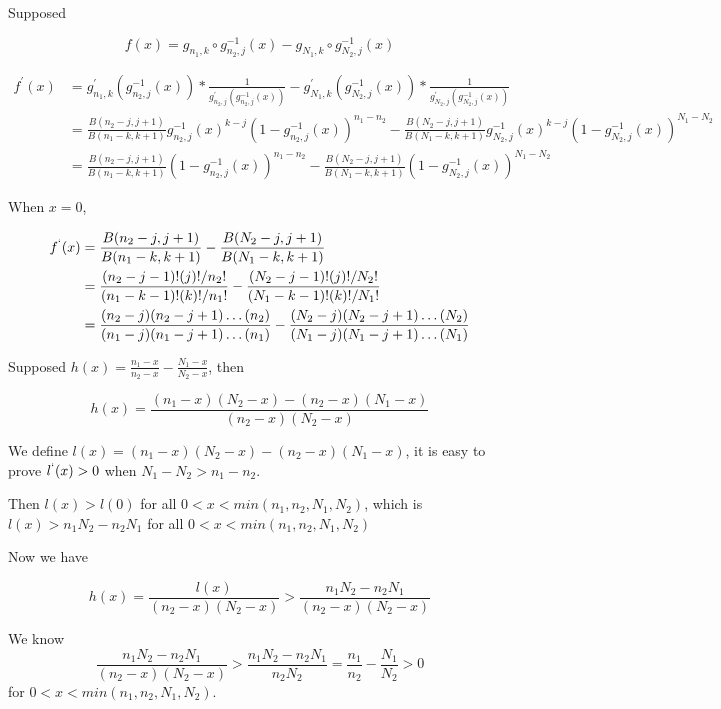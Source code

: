 \documentclass[12pt]{article}
\begin{document}
Supposed

$$f(x) = g_{n_1, k} \circ g_{n_2, j}^{-1}(x) - g_{N_1, k} \circ g_{N_2, j}^{-1}(x)$$

\begin{align*}
	f^{'}(x) &= g_{n_1, k}^{'} ( g_{n_2, j}^{-1}(x)) *\frac{1}{g_{n_2, j}^{'} ( g_{n_2, j}^{-1}(x))} - g_{N_1, k}^{'} ( g_{N_2, j}^{-1}(x)) *\frac{1}{g_{N_2, j}^{'} ( g_{N_2, j}^{-1}(x))} \\
	&= \frac{B(n_2 - j, j+1)}{B(n_1-k,k+1)}g_{n_2, j}^{-1}(x)^{k - j}(1-g_{n_2, j}^{-1}(x))^{n_1 - n_2} - \frac{B(N_2 - j, j+1)}{B(N_1-k,k+1)}g_{N_2, j}^{-1}(x)^{k - j}(1-g_{N_2, j}^{-1}(x))^{N_1 - N_2} \\
	&= \frac{B(n_2 - j, j+1)}{B(n_1-k,k+1)}(1-g_{n_2, j}^{-1}(x))^{n_1 - n_2} - \frac{B(N_2 - j, j+1)}{B(N_1-k,k+1)}(1-g_{N_2, j}^{-1}(x))^{N_1 - N_2}
\end{align*}

When $x = 0$, 

\begin{align*}
	f^{`}(x) &= \frac{B(n_2 - j, j+1)}{B(n_1-k,k+1)} - \frac{B(N_2 - j, j+1)}{B(N_1-k,k+1)}\\
	&= \frac{(n_2 - j - 1)!(j)!/n_2!}{(n_1 - k - 1)!(k)!/n_1!} - \frac{(N_2 - j - 1)!(j)!/N_2!}{(N_1 - k - 1)!(k)!/N_1!}\\
	&= \frac{(n_2 - j)(n_2 - j +1)\dots(n_2)}{(n_1 - j)(n_1 - j +1)\dots(n_1)} - \frac{(N_2 - j)(N_2 - j +1)\dots(N_2)}{(N_1 - j)(N_1 - j +1)\dots(N_1)}
\end{align*}

Supposed $h(x) = \frac{n_1 - x}{n_2 - x} - \frac{N_1 - x}{N_2 - x}$, then

$$h(x) = \frac{(n_1 - x)(N_2 - x) - (n_2 - x)(N_1 - x)}{(n_2 - x)(N_2 - x)}$$ 

We define $l(x) = (n_1 - x)(N_2 - x) - (n_2 - x)(N_1 - x)$, it is easy to prove $l^{`}(x) > 0$ when $N_1 - N_2 > n_1 - n_2$. 

Then $l(x) > l(0)$ for all $0 < x < min(n_1, n_2, N_1, N_2)$, which is $l(x) > n_1N_2 - n_2N_1$ for all $0 < x < min(n_1, n_2, N_1, N_2)$

Now we have

$$h(x) = \frac{l(x)}{(n_2 - x)(N_2 - x)} > \frac{n_1N_2 - n_2N_1}{(n_2 - x)(N_2 - x)}$$

We know $$\frac{n_1N_2 - n_2N_1}{(n_2 - x)(N_2 - x)} > \frac{n_1N_2 - n_2N_1}{n_2N_2} = \frac{n_1}{n_2} - \frac{N_1}{N_2} > 0$$ for $0 < x < min(n_1, n_2, N_1, N_2)$. 
\end{document}
